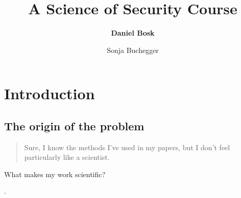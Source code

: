 \title{%
  A Science of Security Course
}
\author{\textbf{Daniel Bosk} \and Sonja Buchegger}


\mode*

\begin{abstract}
  
\end{abstract}


\section{Introduction}

\subsection{The origin of the problem}

\begin{frame}
  \blockcquote{Anonymous}{%
    Sure, I know the methods I've used in my papers, but I don't feel 
    particularly like a scientist.%
  }
\end{frame}

\begin{frame}
  \begin{center}
    What makes my work scientific?
  \end{center}
\end{frame}

\begin{frame}
\end{frame}

\begin{frame}
      .
\end{frame}

